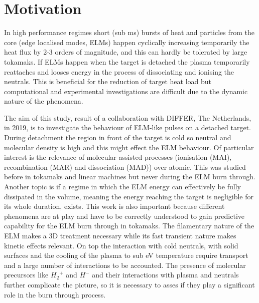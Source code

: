 

\section{Motivation}\label{Motivation magnum-psi}


In high performance regimes short (sub ms) bursts of heat and particles from the core (edge localised modes, ELMs) happen cyclically increasing temporarily the heat flux by 2-3 orders of magnitude, and this can hardly be tolerated by large tokamaks. \cite{Jachmich2011} If ELMs happen when the target is detached the plasma temporarily reattaches and looses energy in the process of dissociating and ionising the neutrals. This is beneficial for the reduction of target heat load but computational and experimental investigations are difficult due to the dynamic nature of the phenomena.

The aim of this study, result of a collaboration with DIFFER, The Netherlands, in 2019, is to investigate the behaviour of ELM-like pulses on a detached target. During detachment the region in front of the target is cold so neutral and molecular density is high and this might effect the ELM behaviour. Of particular interest is the relevance of molecular assisted processes (ionisation (MAI), recombination (MAR) and dissociation (MAD)) over atomic. This was studied before in tokamaks and linear machines but never during the ELM burn through. \cite{Akkermans2020,Verhaegh2021a} Another topic is if a regime in which the ELM energy can effectively be fully dissipated in the volume, meaning the energy reaching the target is negligible for its whole duration, exists. This work is also important because different phenomena are at play and have to be correctly understood to gain predictive capability for the ELM burn through in tokamaks. The filamentary nature of the ELM makes a 3D treatment necessary\cite{Smith2020,Smith2020a} while its fast transient nature makes kinetic effects relevant.\cite{Mijin2020} On top the interaction with cold neutrals, with solid surfaces and the cooling of the plasma to sub eV temperature require transport and a large number of interactions to be accounted.\cite{Zhou2022,Tskhakaya2009} The presence of molecular precursors like ${H_2}^+$ and $H^-$ and their interactions with plasma and neutrals further complicate the picture, so it is necessary to asses if they play a significant role in the burn through process.

